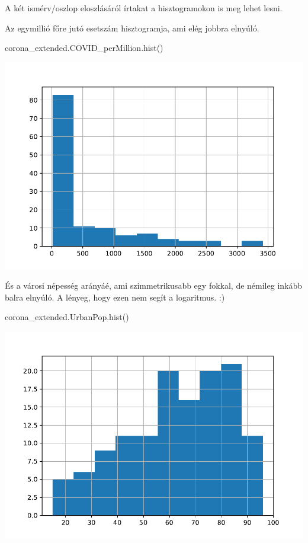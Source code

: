 \documentclass[
]{book}
\newenvironment{Shaded}{\begin{snugshade}}{\end{snugshade}}
\newcommand{\NormalTok}[1]{#1}
\begin{document}
A két ismérv/oszlop eloszlásáról írtakat a hisztogramokon is meg lehet lesni.

Az egymillió főre jutó esetszám hisztogramja, ami elég jobbra elnyúló.

\begin{Shaded}
\begin{Highlighting}[]
\NormalTok{corona\_extended.COVID\_perMillion.hist()}
\end{Highlighting}
\end{Shaded}

\includegraphics{_main_files/figure-latex/unnamed-chunk-125-17.pdf}

És a városi népesség arányáé, ami szimmetrikusabb egy fokkal, de némileg inkább balra elnyúló. A lényeg, hogy ezen nem segít a logaritmus. :)

\begin{Shaded}
\begin{Highlighting}[]
\NormalTok{corona\_extended.UrbanPop.hist()}
\end{Highlighting}
\end{Shaded}

\includegraphics{_main_files/figure-latex/unnamed-chunk-126-19.pdf}
\end{document}
